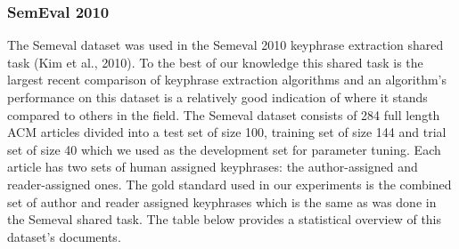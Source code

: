 \documentclass[conference]{IEEEtran}
\begin{document}
\begin{table}[htbp]
\centering
\footnotesize
\caption{My caption}
\tabcolsep=0.10cm
\label{my-label}
\end{table}
\subsubsection{SemEval 2010 \label{semeval}}

The Semeval dataset was used in the Semeval 2010
keyphrase extraction shared task (Kim et al.,
2010). To the best of our knowledge this shared
task is the largest recent comparison of keyphrase
extraction algorithms and an algorithm’s
performance on this dataset is a relatively good
indication of where it stands compared to others in
the field. The Semeval dataset consists of 284 full
length ACM articles divided into a test set of size
100, training set of size 144 and trial set of size 40
which we used as the development set for
parameter tuning. Each article has two sets of
human assigned keyphrases: the author-assigned
and reader-assigned ones. The gold standard used
in our experiments is the combined set of author
and reader assigned keyphrases which is the same
as was done in the Semeval shared task. The table
below provides a statistical overview of this
dataset’s documents.
\end{document}
